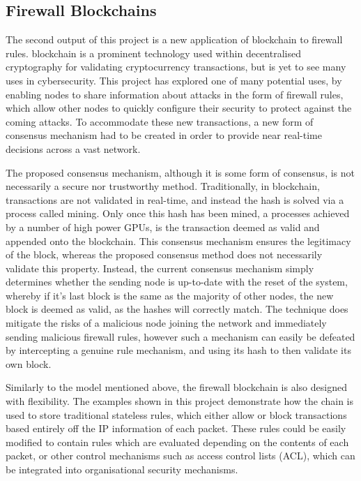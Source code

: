\documentclass[a4paper, 11pt]{report}
\begin{document}
\subsection{Firewall Blockchains}
The second output of this project is a new application of \gls{blockchain} to firewall rules. \Gls{blockchain} is a prominent technology used within decentralised cryptography for validating cryptocurrency transactions, but is yet to see many uses in cybersecurity. This project has explored one of many potential uses, by enabling nodes to share information about attacks in the form of firewall rules, which allow other nodes to quickly configure their security to protect against the coming attacks. To accommodate these new transactions, a new form of consensus mechanism had to be created in order to provide near real-time decisions across a vast network.

The proposed consensus mechanism, although it is some form of consensus, is not necessarily a secure nor trustworthy method. Traditionally, in \gls{blockchain}, transactions are not validated in real-time, and instead the hash is solved via a process called mining. Only once this hash has been mined, a processes achieved by a number of high power GPUs, is the transaction deemed as valid and appended onto the \gls{blockchain}. This consensus mechanism ensures the legitimacy of the block, whereas the proposed consensus method does not necessarily validate this property. Instead, the current consensus mechanism simply determines whether the sending node is up-to-date with the reset of the system, whereby if it's last block is the same as the majority of other nodes, the new block is deemed as valid, as the hashes will correctly match. The technique does mitigate the risks of a malicious node joining the network and immediately sending malicious firewall rules, however such a mechanism can easily be defeated by intercepting a genuine rule mechanism, and using its hash to then validate its own block.

Similarly to the model mentioned above, the firewall \gls{blockchain} is also designed with flexibility. The examples shown in this project demonstrate how the chain is used to store traditional stateless rules, which either allow or block transactions based entirely off the \acrshort{IP} information of each packet. These rules could be easily modified to contain rules which are evaluated depending on the contents of each packet, or other control mechanisms such as access control lists (ACL), which can be integrated into organisational security mechanisms.
\end{document}
